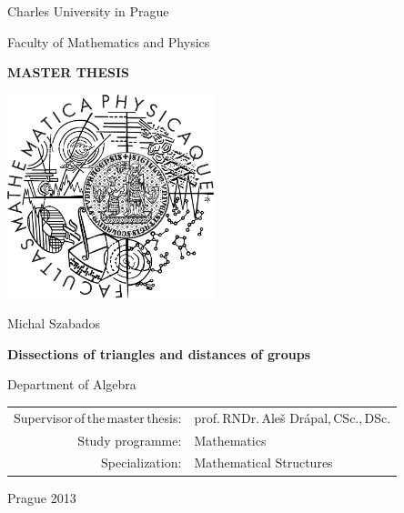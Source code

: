 \documentclass[12pt,a4paper]{report}
\begin{document}


\pagestyle{empty}
\begin{center}

\large

Charles University in Prague

\medskip

Faculty of Mathematics and Physics

\vfill

{\bf\Large MASTER THESIS}

\vfill

\centerline{\mbox{\includegraphics[width=60mm]{./img/logo.pdf}}}

\vfill
\vspace{5mm}

{\LARGE Michal Szabados}

\vspace{15mm}

{\LARGE\bfseries Dissections of triangles and distances of groups}

\vfill

Department of Algebra

\vfill

\begin{tabular}{rl}

Supervisor\,of\,the\,master\,thesis: & prof.\,RNDr.\,Aleš Drápal,\,CSc.,\,DSc.\\
\noalign{\vspace{2mm}}
Study programme: & Mathematics \\
\noalign{\vspace{2mm}}
Specialization: & Mathematical Structures \\
\end{tabular}

\vfill

Prague 2013

\end{center}
\end{document}
